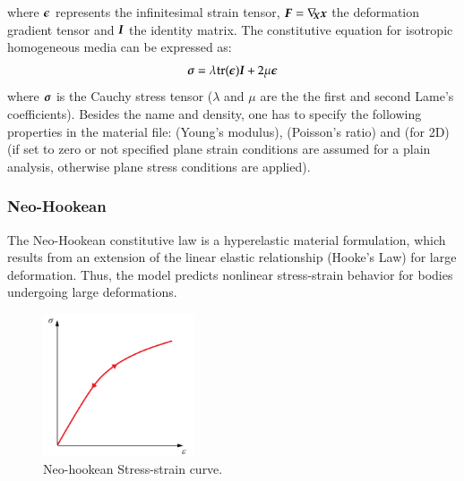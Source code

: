 where $\boldsymbol{\epsilon}$ represents the infinitesimal strain tensor, $\boldsymbol{F} = \nabla_{\!\!\boldsymbol{X}}\boldsymbol{x}$ the deformation gradient tensor and $\boldsymbol{I}$ the identity matrix. The constitutive equation for isotropic homogeneous media can be expressed as:
\begin{equation}\label{eqn:smm:material:constitutive_elastic}
  \boldsymbol{\sigma } =\lambda\mathrm{tr}(\boldsymbol{\epsilon})\boldsymbol{I}+2 \mu \boldsymbol{\epsilon}
\end{equation}
where $\boldsymbol{\sigma}$ is the Cauchy stress tensor ($\lambda$ and $\mu$ are the the first  and second Lame's coefficients). Besides the name and density, one has to specify the following properties in the material file:  (Young's modulus),  (Poisson's ratio) and (for 2D)  (if set to zero or not specified plane strain conditions are assumed for a plain analysis, otherwise plane stress conditions are applied).


\subsubsection{Neo-Hookean}
The Neo-Hookean constitutive law is a hyperelastic material formulation, which results from an extension of the linear elastic relationship (Hooke's Law) for large deformation. Thus, the model predicts nonlinear stress-strain behavior for bodies undergoing large deformations.

\begin{figure}[!htb]
  \begin{center}
    \includegraphics[width=0.4\textwidth,keepaspectratio=true]{figures/stress_strain_neo.pdf}
    \caption{Neo-hookean Stress-strain curve.}
    \label{fig:smm:cl:neo_hookean}
  \end{center}
\end{figure}

